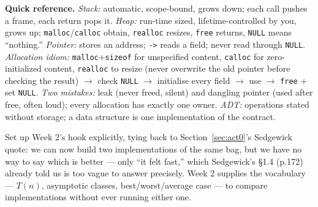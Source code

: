 \documentclass[11pt]{article}
\begin{document}
\textbf{Quick reference.} \emph{Stack:} automatic, scope-bound, grows down; each call pushes a frame, each return pops it. \emph{Heap:} run-time sized, lifetime-controlled by you, grows up; \texttt{malloc}/\texttt{calloc} obtain, \texttt{realloc} resizes, \texttt{free} returns, \texttt{NULL} means ``nothing.'' \emph{Pointer:} stores an address; \texttt{->} reads a field; never read through \texttt{NULL}. \emph{Allocation idiom:} \texttt{malloc}+\texttt{sizeof} for unspecified content, \texttt{calloc} for zero-initialized content, \texttt{realloc} to resize (never overwrite the old pointer before checking the result) $\rightarrow$ check \texttt{NULL} $\rightarrow$ initialise every field $\rightarrow$ use $\rightarrow$ \texttt{free} + set \texttt{NULL}. \emph{Two mistakes:} leak (never freed, silent) and dangling pointer (used after free, often loud); every allocation has exactly one owner. \emph{ADT:} operations stated without storage; a data structure is one implementation of the contract.

Set up Week 2's hook explicitly, tying back to Section~\ref{sec:act0}'s Sedgewick quote: we can now build two implementations of the same bag, but we have no way to say which is better --- only ``it felt fast,'' which Sedgewick's \S1.4 (p.172) already told us is too vague to answer precisely. Week 2 supplies the vocabulary --- $T(n)$, asymptotic classes, best/worst/average case --- to compare implementations without ever running either one.



\end{document}
